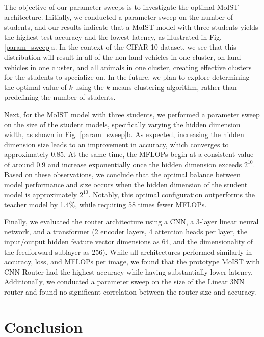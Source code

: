 \documentclass[conference]{IEEEtran}
\begin{document}
The objective of our parameter sweeps is to investigate the optimal MoIST architecture. Initially, we conducted a parameter sweep on the number of students, and our results indicate that a MoIST model with three students yields the highest test accuracy and the lowest latency, as illustrated in Fig. \ref{param_sweep}a. In the context of the CIFAR-10 dataset, we see that this distribution will result in all of the non-land vehicles in one cluster, on-land vehicles in one cluster, and all animals in one cluster, creating effective clusters for the students to specialize on. In the future, we plan to explore determining the optimal value of $k$ using the $k$-means clustering algorithm, rather than predefining the number of students.

Next, for the MoIST model with three students, we performed a parameter sweep on the size of the student models, specifically varying the hidden dimension width, as shown in Fig. \ref{param_sweep}b. As expected, increasing the hidden dimension size leads to an improvement in accuracy, which converges to approximately 0.85. At the same time, the MFLOPs begin at a consistent value of around 0.9 and increase exponentially once the hidden dimension exceeds $2^{10}$. Based on these observations, we conclude that the optimal balance between model performance and size occurs when the hidden dimension of the student model is approximately $2^{10}$. Notably, this optimal configuration outperforms the teacher model by 1.4\%, while requiring 58 times fewer MFLOPs.

Finally, we evaluated the router architecture using a CNN, a 3-layer linear neural network, and a transformer (2 encoder layers, 4 attention heads per layer, the input/output hidden feature vector dimensions as 64, and the dimensionality of the feedforward sublayer as 256). While all architectures performed similarly in accuracy, loss, and MFLOPs per image, we found that the prototype MoIST with CNN Router had the highest accuracy while having substantially lower latency. Additionally, we conducted a parameter sweep on the size of the Linear 3NN router and found no significant correlation between the router size and accuracy.

\section{Conclusion}
\end{document}
